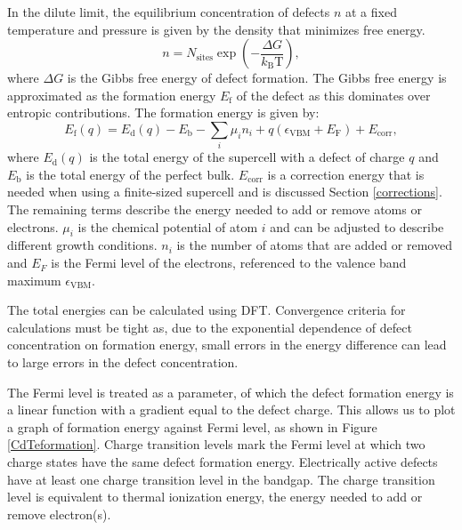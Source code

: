 In the dilute limit, the equilibrium concentration of defects $n$ at a fixed temperature and pressure is given by the density that minimizes free energy.
\begin{equation} \label{defectconcentration}
    n = N_\mathrm{sites} \exp \left(-\frac{\Delta G}{k_\mathrm{B} \mathrm{T}} \right),
\end{equation}
where $\Delta G$ is the Gibbs free energy of defect formation. The Gibbs free energy is approximated as the formation energy $E_\mathrm{f}$ of the defect as this dominates over entropic contributions. The formation energy is given by:
\begin{equation} \label{eqn_formation_energy}
E_\mathrm{f}(q) = E_\mathrm{d}(q) - E_\mathrm{b} - \sum_i \mu_i n_i + q(\epsilon_\mathrm{VBM}+E_\mathrm{F}) + E_\mathrm{corr},
\end{equation}
where $E_\mathrm{d}(q)$ is the total energy of the supercell with a defect of charge $q$ and $E_\mathrm{b}$ is the total energy of the perfect bulk. 
$E_\mathrm{corr}$ is a correction energy that is needed when using a finite-sized supercell and is discussed Section \ref{corrections}.
The remaining terms describe the energy needed to add or remove atoms or electrons.
$\mu_i$ is the chemical potential of atom $i$ and can be adjusted to describe different growth conditions. 
$n_i$ is the number of atoms that are added or removed and $E_F$ is the Fermi level of the electrons, referenced to the valence band maximum $\epsilon_\mathrm{VBM}$.

The total energies can be calculated using DFT. Convergence criteria for calculations must be tight as, due to the exponential dependence of defect concentration on formation energy, small errors in the energy difference can lead to large errors in the defect concentration.

The Fermi level is treated as a parameter, of which the defect formation energy is a linear function with a gradient equal to the defect charge. This allows us to plot a graph of formation energy against Fermi level, as shown in Figure \ref{CdTeformation}. Charge transition levels mark the Fermi level at which two charge states have the same defect formation energy. Electrically active defects have at least one charge transition level in the bandgap. 
The charge transition level is equivalent to thermal ionization energy, the energy needed to add or remove electron(s). %

